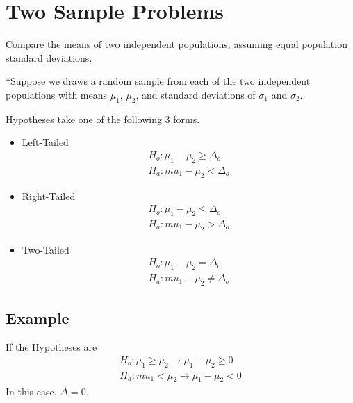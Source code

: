 \documentclass{article}
\begin{document}
        \section*{Two Sample Problems}
        Compare the means of two independent populations, assuming equal population standard deviations.\par

        *Suppose we draws a random sample from each of the two independent populations 
        with means $\mu_{1}$, $\mu_{2}$, and standard deviations of $\sigma_{1}$ and $\sigma_{2}$.\par

        Hypotheses take one of the following 3 forms.
        \begin{itemize}
            \item Left-Tailed
                \begin{align*}
                    H_{o}: \mu_{1} -  \mu_{2} \geq \Delta_o\\
                    H_{a}: mu_{1} -  \mu_{2} < \Delta_o
                \end{align*}
            \item Right-Tailed
                \begin{align*}
                    H_{o}: \mu_{1} -  \mu_{2} \leq \Delta_o\\
                    H_{a}: mu_{1} -  \mu_{2} > \Delta_o
                \end{align*}
            \item Two-Tailed
                \begin{align*}
                    H_{o}: \mu_{1} -  \mu_{2} = \Delta_o\\
                    H_{a}: mu_{1} -  \mu_{2} \neq \Delta_o
                \end{align*}
        \end{itemize}

        \subsection*{Example}

        If the Hypotheses are
            \begin{align*}
                H_{o}: \mu_{1} \geq  \mu_{2} \rightarrow \mu_{1} - \mu_{2} \geq 0\\
                H_{a}: mu_{1} <  \mu_{2}  \rightarrow \mu_{1} - \mu_{2} < 0
            \end{align*}
        In this case, $\Delta = 0$.
\end{document}
